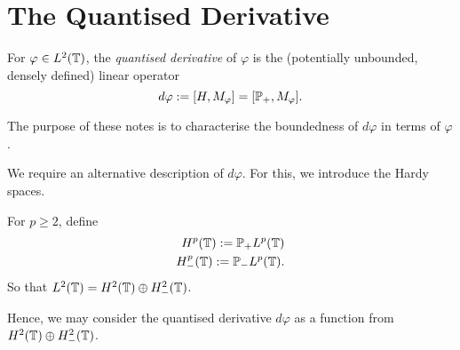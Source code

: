 \documentclass{unswmaths}
\begin{document}
\section*{The Quantised Derivative}

\begin{definition}
    For $\varphi \in L^2(\mathbb{T})$, the \emph{quantised derivative} of $\varphi$ is the (potentially unbounded, densely defined) linear operator
    \begin{equation*}
        d\varphi := [H,M_\varphi] = [\mathbb{P}_+,M_\varphi].
    \end{equation*}
\end{definition}
The purpose of these notes is to characterise the boundedness of $d\varphi$ in terms of $\varphi$.

We require an alternative description of $d\varphi$. For this, we introduce the Hardy spaces.
\begin{definition}
    For $p\geq 2$, define
    \begin{align*}
        H^p(\mathbb{T}) := \mathbb{P}_+ L^p(\mathbb{T})\\
        H^p_-(\mathbb{T}) := \mathbb{P}_- L^p(\mathbb{T}).
    \end{align*}
    So that $L^2(\mathbb{T}) = H^2(\mathbb{T})\oplus H^2_-(\mathbb{T})$. 
\end{definition}

Hence, we may consider the quantised derivative $d\varphi$ as a function from $H^2(\mathbb{T})\oplus H^2_-(\mathbb{T})$.
\end{document}
